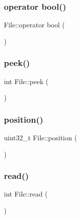 \subsubsection{\texorpdfstring{operator bool()}{operator bool()}}
{\footnotesize\ttfamily File\+::operator bool (\begin{DoxyParamCaption}{ }\end{DoxyParamCaption})}

\mbox{\label{class_s_d_lib_1_1_file_a0e5025f39bd584563bfe4b05fc1db268}} 
\subsubsection{\texorpdfstring{peek()}{peek()}}
{\footnotesize\ttfamily int File\+::peek (\begin{DoxyParamCaption}{ }\end{DoxyParamCaption})\hspace{0.3cm}{\ttfamily [virtual]}}

\mbox{\label{class_s_d_lib_1_1_file_aae991c597c0bc4c5eb44c1f3b06a21ec}} 
\subsubsection{\texorpdfstring{position()}{position()}}
{\footnotesize\ttfamily uint32\+\_\+t File\+::position (\begin{DoxyParamCaption}{ }\end{DoxyParamCaption})}

\mbox{\label{class_s_d_lib_1_1_file_a4c46a1975e66c37977bf07c58ec10b4e}} 
\subsubsection{\texorpdfstring{read()}{read()}\hspace{0.1cm}{\footnotesize\ttfamily [1/2]}}
{\footnotesize\ttfamily int File\+::read (\begin{DoxyParamCaption}{ }\end{DoxyParamCaption})\hspace{0.3cm}{\ttfamily [virtual]}}

